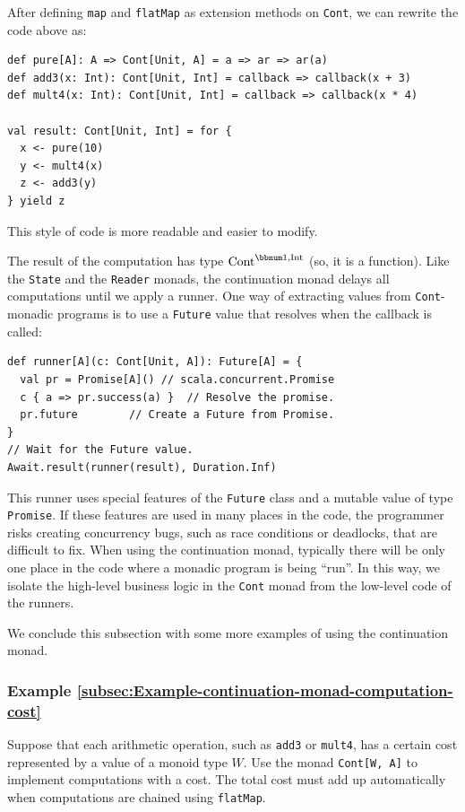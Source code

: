 After defining \lstinline!map! and \lstinline!flatMap! as extension
methods on \lstinline!Cont!, we can rewrite the code above as:
\begin{lstlisting}
def pure[A]: A => Cont[Unit, A] = a => ar => ar(a)
def add3(x: Int): Cont[Unit, Int] = callback => callback(x + 3)
def mult4(x: Int): Cont[Unit, Int] = callback => callback(x * 4)

val result: Cont[Unit, Int] = for {
  x <- pure(10)
  y <- mult4(x)
  z <- add3(y)
} yield z
\end{lstlisting}
This style of code is more readable and easier to modify.

The result of the computation has type $\text{Cont}^{\bbnum 1,\text{Int}}$
(so, it is a function). Like the \lstinline!State! and the \lstinline!Reader!
monads, the continuation monad delays all computations until we apply
a runner. One way of extracting values from
\lstinline!Cont!-monadic programs is to use a \lstinline!Future!
value that resolves when the callback is called:
\begin{lstlisting}
def runner[A](c: Cont[Unit, A]): Future[A] = {
  val pr = Promise[A]() // scala.concurrent.Promise
  c { a => pr.success(a) }  // Resolve the promise.
  pr.future        // Create a Future from Promise.
}
// Wait for the Future value.
Await.result(runner(result), Duration.Inf)
\end{lstlisting}
This runner uses special features of the \lstinline!Future! class
and a mutable value of type \lstinline!Promise!. If these features
are used in many places in the code, the programmer risks creating
concurrency bugs, such as race conditions or deadlocks, that are difficult
to fix. When using the continuation monad, typically there will be
only one place in the code where a monadic program is being \textsf{``}run\textsf{''}.
In this way, we isolate the high-level business logic in the \lstinline!Cont!
monad from the low-level code of the runners.

We conclude this subsection with some more examples of using the continuation
monad.

\subsubsection{Example \label{subsec:Example-continuation-monad-computation-cost}\ref{subsec:Example-continuation-monad-computation-cost}}

Suppose that each arithmetic operation, such as \lstinline!add3!
or \lstinline!mult4!, has a certain cost represented by a value of
a monoid type $W$. Use the monad \lstinline!Cont[W, A]! to implement
computations with a cost. The total cost must add up automatically
when computations are chained using \lstinline!flatMap!.

